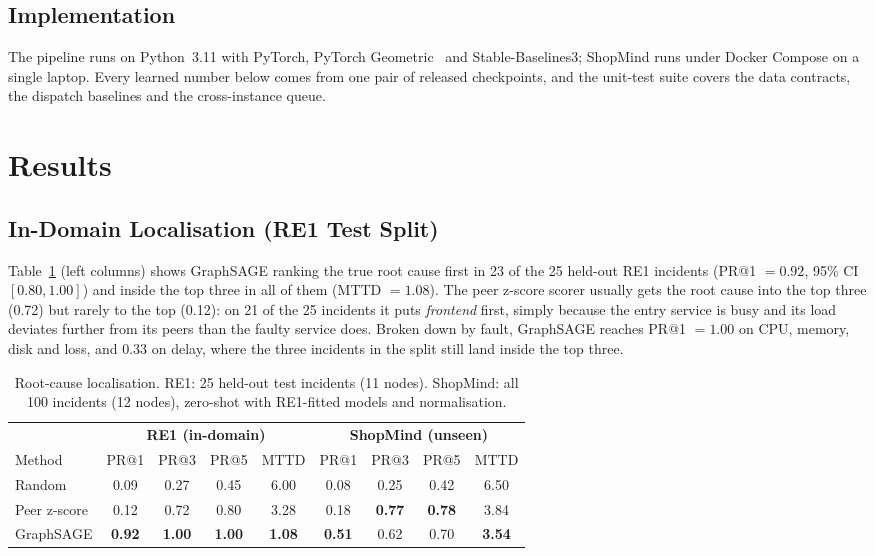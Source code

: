 \documentclass[conference,a4paper]{IEEEtran}
\begin{document}
\subsection{Implementation}
The pipeline runs on Python~3.11 with PyTorch, PyTorch Geometric~\cite{fey2019pyg} and Stable-Baselines3; ShopMind runs under Docker Compose on a single laptop. Every learned number below comes from one pair of released checkpoints, and the unit-test suite covers the data contracts, the dispatch baselines and the cross-instance queue.

\section{Results}
\subsection{In-Domain Localisation (RE1 Test Split)}
Table~\ref{tab:loc} (left columns) shows GraphSAGE ranking the true root cause first in 23 of the 25 held-out RE1 incidents (PR@1 $=0.92$, 95\% CI $[0.80,1.00]$) and inside the top three in all of them (MTTD $=1.08$). The peer z-score scorer usually gets the root cause into the top three (0.72) but rarely to the top (0.12): on 21 of the 25 incidents it puts \emph{frontend} first, simply because the entry service is busy and its load deviates further from its peers than the faulty service does. Broken down by fault, GraphSAGE reaches PR@1 $=1.00$ on CPU, memory, disk and loss, and $0.33$ on delay, where the three incidents in the split still land inside the top three.

\begin{table}[t]
\centering
\caption{Root-cause localisation. RE1: 25 held-out test incidents (11 nodes). ShopMind: all 100 incidents (12 nodes), zero-shot with RE1-fitted models and normalisation.}
\label{tab:loc}
\setlength{\tabcolsep}{1.6pt}
\footnotesize
\begin{tabular}{lcccc@{\hspace{4pt}}cccc}
\toprule
 & \multicolumn{4}{c}{\textbf{RE1 (in-domain)}} & \multicolumn{4}{c}{\textbf{ShopMind (unseen)}} \\
\cmidrule(lr){2-5}\cmidrule(lr){6-9}
Method & PR@1 & PR@3 & PR@5 & MTTD & PR@1 & PR@3 & PR@5 & MTTD \\
\midrule
Random         & 0.09 & 0.27 & 0.45 & 6.00 & 0.08 & 0.25 & 0.42 & 6.50 \\
Peer z-score   & 0.12 & 0.72 & 0.80 & 3.28 & 0.18 & \textbf{0.77} & \textbf{0.78} & 3.84 \\
GraphSAGE      & \textbf{0.92} & \textbf{1.00} & \textbf{1.00} & \textbf{1.08} & \textbf{0.51} & 0.62 & 0.70 & \textbf{3.54} \\
\bottomrule
\end{tabular}
\end{table}
\end{document}
